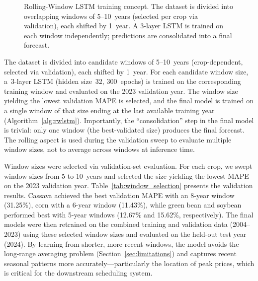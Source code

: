 \documentclass[journal]{IEEEtran}
\begin{document}
\begin{figure}[htbp]
{}%
  \caption{Rolling-Window LSTM training concept. The dataset is divided into overlapping windows of 5--10~years (selected per crop via validation), each shifted by 1~year. A 3-layer LSTM is trained on each window independently; predictions are consolidated into a final forecast.}
  \label{fig:rolling}
\end{figure}

The dataset is divided into candidate windows of 5--10~years (crop-dependent, selected via validation), each shifted by 1~year. For each candidate window size, a~3-layer LSTM (hidden size~32, 300~epochs) is trained on the corresponding training window and evaluated on the 2023 validation year. The window size yielding the lowest validation MAPE is selected, and the final model is trained on a single window of that size ending at the last available training year (Algorithm~\ref{alg:rwlstm}). Importantly, the ``consolidation'' step in the final model is trivial: only one window (the best-validated size) produces the final forecast. The rolling aspect is used during the validation sweep to evaluate multiple window sizes, not to average across windows at inference time.

Window sizes were selected via validation-set evaluation. For each crop, we swept window sizes from 5 to 10~years and selected the size yielding the lowest MAPE on the 2023 validation year. Table~\ref{tab:window_selection} presents the validation results. Cassava achieved the best validation MAPE with an 8-year window (31.25\%), corn with a 6-year window (11.43\%), while green bean and soybean performed best with 5-year windows (12.67\% and 15.62\%, respectively). The final models were then retrained on the combined training and validation data (2004--2023) using these selected window sizes and evaluated on the held-out test year (2024). By learning from shorter, more recent windows, the model avoids the long-range averaging problem (Section~\ref{sec:limitations}) and captures recent seasonal patterns more accurately---particularly the location of peak prices, which is critical for the downstream scheduling system.
\end{document}
